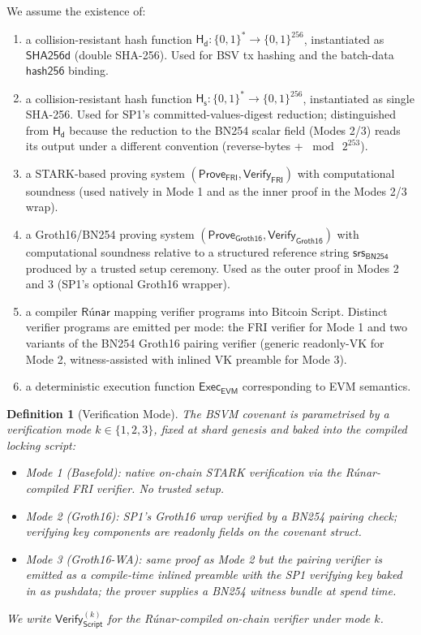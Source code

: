 \documentclass[11pt,a4paper]{article}
\newtheorem{definition}{Definition}[section]
\newcommand{\Hashd}{\mathsf{H_d}}        %
\newcommand{\Hashs}{\mathsf{H_s}}        %
\newcommand{\Verify}{\mathsf{Verify}}
\newcommand{\Prove}{\mathsf{Prove}}
\newcommand{\Exec}{\mathsf{Exec}}
\newcommand{\FRI}{\mathsf{FRI}}
\newcommand{\Groth}{\mathsf{Groth16}}    %
\newcommand{\EVM}{\mathsf{EVM}}
\newcommand{\Runar}{\textsf{R\'{u}nar}}
\newcommand{\SRS}{\mathsf{srs}_{\mathsf{BN254}}}  %
\begin{document}
We assume the existence of:
\begin{enumerate}[nosep,label=(\roman*)]
    \item a collision-resistant hash function $\Hashd : \{0,1\}^* \to \{0,1\}^{256}$, instantiated as $\mathsf{SHA256d}$ (double SHA-256). Used for BSV tx hashing and the batch-data $\mathsf{hash256}$ binding.
    \item a collision-resistant hash function $\Hashs : \{0,1\}^* \to \{0,1\}^{256}$, instantiated as single SHA-256. Used for SP1's committed-values-digest reduction; distinguished from $\Hashd$ because the reduction to the BN254 scalar field (Modes 2/3) reads its output under a different convention (reverse-bytes + $\bmod\ 2^{253}$).
    \item a STARK-based proving system $(\Prove_{\FRI}, \Verify_{\FRI})$ with computational soundness (used natively in Mode 1 and as the inner proof in the Modes 2/3 wrap).
    \item a Groth16/BN254 proving system $(\Prove_{\Groth}, \Verify_{\Groth})$ with computational soundness relative to a structured reference string $\SRS$ produced by a trusted setup ceremony. Used as the outer proof in Modes 2 and 3 (SP1's optional Groth16 wrapper).
    \item a compiler $\Runar$ mapping verifier programs into Bitcoin Script. Distinct verifier programs are emitted per mode: the FRI verifier for Mode 1 and two variants of the BN254 Groth16 pairing verifier (generic readonly-VK for Mode 2, witness-assisted with inlined VK preamble for Mode 3).
    \item a deterministic execution function $\Exec_{\EVM}$ corresponding to EVM semantics.
\end{enumerate}

\begin{definition}[Verification Mode]\label{def:mode}
The BSVM covenant is parametrised by a verification mode $k \in \{1, 2, 3\}$, fixed at shard genesis and baked into the compiled locking script:
\begin{itemize}[nosep]
    \item \emph{Mode 1 (Basefold)}: native on-chain STARK verification via the Rúnar-compiled FRI verifier. No trusted setup.
    \item \emph{Mode 2 (Groth16)}: SP1's Groth16 wrap verified by a BN254 pairing check; verifying key components are readonly fields on the covenant struct.
    \item \emph{Mode 3 (Groth16-WA)}: same proof as Mode 2 but the pairing verifier is emitted as a compile-time inlined preamble with the SP1 verifying key baked in as pushdata; the prover supplies a BN254 witness bundle at spend time.
\end{itemize}
We write $\Verify_{\mathsf{Script}}^{(k)}$ for the Rúnar-compiled on-chain verifier under mode $k$.
\end{definition}
\end{document}
